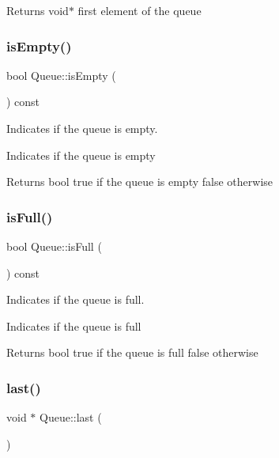 \begin{DoxyReturn}{Returns}
void$\ast$ first element of the queue 
\end{DoxyReturn}
\mbox{\label{class_queue_a7614672eed4a720bf0d78d94002bd022}} 
\subsubsection{\texorpdfstring{is\+Empty()}{isEmpty()}}
{\footnotesize\ttfamily bool Queue\+::is\+Empty (\begin{DoxyParamCaption}{ }\end{DoxyParamCaption}) const}



Indicates if the queue is empty. 

Indicates if the queue is empty

\begin{DoxyReturn}{Returns}
bool true if the queue is empty false otherwise 
\end{DoxyReturn}
\mbox{\label{class_queue_a20268d0ce4bb6b9f9a98ad77d30a5a18}} 
\subsubsection{\texorpdfstring{is\+Full()}{isFull()}}
{\footnotesize\ttfamily bool Queue\+::is\+Full (\begin{DoxyParamCaption}{ }\end{DoxyParamCaption}) const}



Indicates if the queue is full. 

Indicates if the queue is full

\begin{DoxyReturn}{Returns}
bool true if the queue is full false otherwise 
\end{DoxyReturn}
\mbox{\label{class_queue_ae96cdb4a19e958f9c8ed6ee2175edacc}} 
\subsubsection{\texorpdfstring{last()}{last()}}
{\footnotesize\ttfamily void $\ast$ Queue\+::last (\begin{DoxyParamCaption}{ }\end{DoxyParamCaption})}



